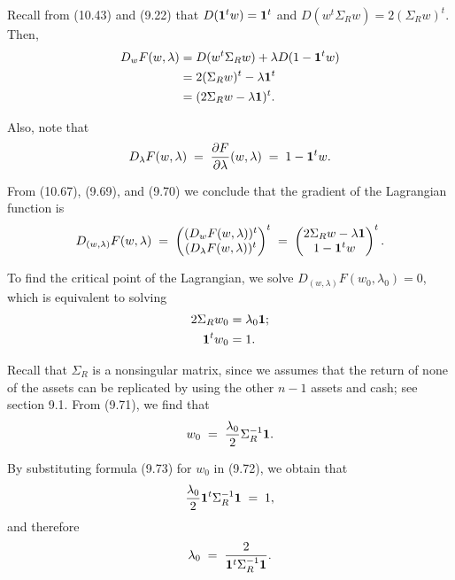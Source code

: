 
Recall from (10.43) and (9.22) that $D(\mathbf{1}^tw)=\mathbf{1}^t$ and
$D(w^t\Sigma_Rw)=2(\Sigma_Rw)^t$. Then,
\begin{align}
D_wF(w,\lambda) &= D(w^t\Sigma_Rw)+\lambda D(1-\mathbf{1}^tw) \notag\\
&= 2(\Sigma_Rw)^t-\lambda\mathbf{1}^t \notag\\
&= (2\Sigma_Rw-\lambda\mathbf{1})^t.
\end{align}

Also, note that
\begin{equation}
D_\lambda F(w,\lambda) \;=\; \frac{\partial F}{\partial \lambda}(w,\lambda) \;=\; 1-\mathbf{1}^tw.
\end{equation}

From (10.67), (9.69), and (9.70) we conclude that the gradient of the Lagrangian
function is
\[
D_{(w,\lambda)}F(w,\lambda) \;=\;
\begin{pmatrix} (D_wF(w,\lambda))^t \\ (D_\lambda F(w,\lambda))^t \end{pmatrix}^t
\;=\;
\begin{pmatrix} 2\Sigma_Rw-\lambda\mathbf{1} \\ 1-\mathbf{1}^tw \end{pmatrix}^t.
\]

To find the critical point of the Lagrangian, we solve $D_{(w,\lambda)}F(w_0,\lambda_0)
= 0$, which is equivalent to solving
\begin{align}
2\Sigma_Rw_0 &= \lambda_0\mathbf{1}; \\
\mathbf{1}^tw_0 &= 1.
\end{align}

Recall that $\Sigma_R$ is a nonsingular matrix, since we assumes that the return of
none of the assets can be replicated by using the other $n-1$ assets and cash; see
section 9.1. From (9.71), we find that
\begin{equation}
w_0 \;=\; \frac{\lambda_0}{2}\Sigma_R^{-1}\mathbf{1}.
\end{equation}

By substituting formula (9.73) for $w_0$ in (9.72), we obtain that
\[
\frac{\lambda_0}{2}\mathbf{1}^t\Sigma_R^{-1}\mathbf{1} \;=\; 1,
\]
and therefore
\begin{equation}
\lambda_0 \;=\; \frac{2}{\mathbf{1}^t\Sigma_R^{-1}\mathbf{1}}.
\end{equation}


